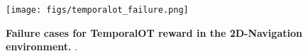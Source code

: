 \begin{figure}
    \centering
    \texttt{[image: figs/temporalot\_failure.png]}
    \caption{\small \textbf{Failure cases for TemporalOT reward in the 2D-Navigation environment.} . }
    \label{fig:temporalot_fail}
\end{figure}